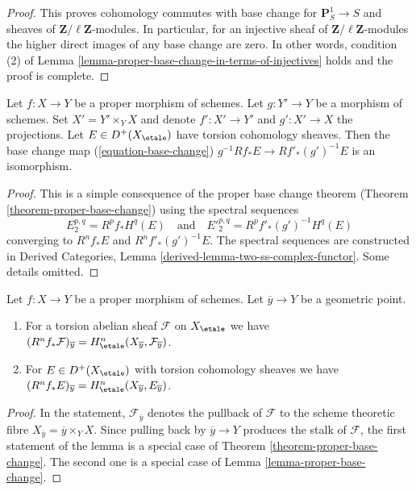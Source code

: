 \begin{proof}
\medskip\noindent
This proves cohomology commutes with base change for
$\mathbf{P}^1_S \to S$ and sheaves of $\mathbf{Z}/\ell\mathbf{Z}$-modules.
In particular, for an injective sheaf of $\mathbf{Z}/\ell\mathbf{Z}$-modules
the higher direct images of any base change are zero.
In other words, condition (2) of
Lemma \ref{lemma-proper-base-change-in-terms-of-injectives}
holds and the proof is complete.
\end{proof}

\begin{lemma}
\label{lemma-proper-base-change}
Let $f : X \to Y$ be a proper morphism of schemes. Let $g : Y' \to Y$ be
a morphism of schemes. Set $X' = Y' \times_Y X$ and denote
$f' : X' \to Y'$ and $g' : X' \to X$ the projections.
Let $E \in D^+(X_\etale)$ have torsion cohomology sheaves.
Then the base change map (\ref{equation-base-change})
$g^{-1}Rf_*E \to Rf'_*(g')^{-1}E$
is an isomorphism.
\end{lemma}

\begin{proof}
This is a simple consequence of the proper base change theorem
(Theorem \ref{theorem-proper-base-change}) using the spectral
sequences
$$
E_2^{p, q} = R^pf_*H^q(E)
\quad\text{and}\quad
{E'}_2^{p, q} = R^pf'_*(g')^{-1}H^q(E)
$$
converging to $R^nf_*E$ and $R^nf'_*(g')^{-1}E$.
The spectral sequences are constructed in
Derived Categories, Lemma \ref{derived-lemma-two-ss-complex-functor}.
Some details omitted.
\end{proof}

\begin{lemma}
\label{lemma-proper-base-change-stalk}
Let $f : X \to Y$ be a proper morphism of schemes. Let $\overline{y} \to Y$
be a geometric point.
\begin{enumerate}
\item For a torsion abelian sheaf $\mathcal{F}$ on $X_\etale$ we have
$(R^nf_*\mathcal{F})_{\overline{y}} =
H^n_\etale(X_{\overline{y}}, \mathcal{F}_{\overline{y}})$.
\item For $E \in D^+(X_\etale)$ with torsion cohomology sheaves we have
$(R^nf_*E)_{\overline{y}} = H^n_\etale(X_{\overline{y}}, E_{\overline{y}})$.
\end{enumerate}
\end{lemma}

\begin{proof}
In the statement, $\mathcal{F}_{\overline{y}}$ denotes the pullback
of $\mathcal{F}$ to the scheme theoretic fibre
$X_{\overline{y}} = \overline{y} \times_Y X$.
Since pulling back by $\overline{y} \to Y$ produces the
stalk of $\mathcal{F}$, the first statement of the lemma
is a special case of Theorem \ref{theorem-proper-base-change}.
The second one is a special case of Lemma \ref{lemma-proper-base-change}.
\end{proof}

